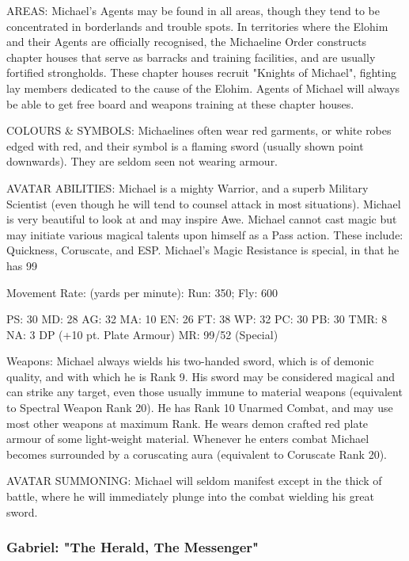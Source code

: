 \begin{Description}
AREAS: Michael's Agents may be found in all areas, though they tend to be concentrated in borderlands and trouble spots. In territories where the Elohim and their Agents are officially recognised, the Michaeline Order constructs chapter houses that serve as barracks and training facilities, and are usually fortified strongholds. These chapter houses recruit "Knights of Michael", fighting lay members dedicated to the cause of the Elohim. Agents of Michael will always be able to get free board and weapons training at these chapter houses.

COLOURS \& SYMBOLS: Michaelines often wear red garments, or white robes edged with red, and their symbol is a flaming sword (usually shown point downwards). They are seldom seen not wearing armour.

AVATAR ABILITIES: Michael is a mighty Warrior, and a superb Military Scientist (even though he will tend to counsel attack in most situations). Michael is very beautiful to look at and may inspire Awe. Michael cannot cast magic but may initiate various magical talents upon himself as a Pass action. These include: Quickness, Coruscate, and ESP. Michael's Magic Resistance is special, in that he has 99%

Movement Rate: (yards per minute): Run: 350; Fly: 600

PS: 30	MD: 28	AG: 32	MA: 10
EN: 26	FT: 38	WP: 32	PC: 30
PB: 30	TMR: 8	NA: 3 DP (+10 pt. Plate Armour)
MR: 99/52 (Special)

Weapons: Michael always wields his two-handed sword, which is of demonic quality, and with which he is Rank 9. His sword may be considered magical and can strike any target, even those usually immune to material weapons (equivalent to Spectral Weapon Rank 20). He has Rank 10 Unarmed Combat, and may use most other weapons at maximum Rank. He wears demon crafted red plate armour of some light-weight material. Whenever he enters combat Michael becomes surrounded by a coruscating aura (equivalent to Coruscate Rank 20).

AVATAR SUMMONING: Michael will seldom manifest except in the thick of battle, where he will immediately plunge into the combat wielding his great sword.
\end{Description}

\subsubsection{Gabriel: "The Herald, The Messenger"}

